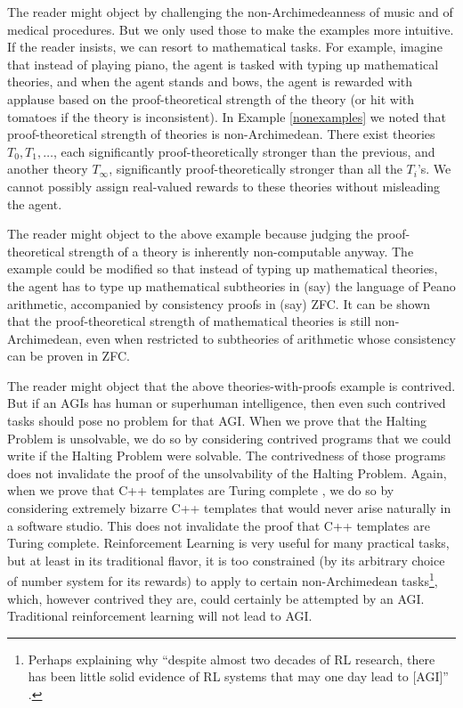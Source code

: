 \documentclass[reqno]{article}
\theoremstyle{definition}
\begin{document}
The reader might object by challenging the non-Archimedeanness
of music and of medical procedures. But we only used those to make the examples
more intuitive. If the reader insists, we can resort to mathematical tasks.
For example, imagine that instead of playing piano, the agent is tasked with
typing up mathematical theories, and when the agent stands and bows, the agent
is rewarded with applause based on the proof-theoretical strength of the theory
(or hit with tomatoes if the theory is inconsistent).
In Example \ref{nonexamples} we noted that proof-theoretical strength of theories
is non-Archimedean. There exist theories $T_0,T_1,\ldots$, each significantly
proof-theoretically stronger than the previous, and another theory $T_\infty$,
significantly proof-theoretically stronger than all the $T_i$'s. We cannot
possibly assign real-valued rewards to these theories without misleading the
agent.

The reader might object to the above example because judging the proof-theoretical
strength of a theory is inherently non-computable anyway. The example could be
modified so that instead of typing up mathematical theories, the agent has to
type up mathematical subtheories in (say) the language of Peano arithmetic,
accompanied by consistency proofs in (say) ZFC. It can be shown that the
proof-theoretical strength of mathematical theories is still non-Archimedean,
even when restricted to subtheories of arithmetic whose consistency can be
proven in ZFC.

The reader might object that the above theories-with-proofs example is contrived.
But if an AGIs has human or superhuman intelligence, then even such contrived
tasks should pose no problem for that AGI. When we prove that the Halting Problem
is unsolvable, we do so by considering contrived programs that we could write if
the Halting Problem were solvable. The contrivedness of those programs does not
invalidate the proof of the unsolvability of the Halting Problem. Again, when we
prove that C++ templates are Turing complete \cite{veldhuizen}, we do so by
considering extremely
bizarre C++ templates that would never arise naturally in a software
studio. This does not invalidate the proof that C++ templates are Turing complete.
Reinforcement Learning is very useful for many practical tasks, but at least in
its traditional flavor, it is too constrained (by its arbitrary choice of number
system for its rewards) to apply to certain
non-Archimedean tasks\footnote{Perhaps explaining why
``despite almost two decades of RL research, there has been little solid
evidence of RL systems that may one day lead to [AGI]''
\cite{livingston}.}, which, however contrived they are, could certainly be
attempted by an AGI. Traditional reinforcement learning will not lead to AGI.
\end{document}
